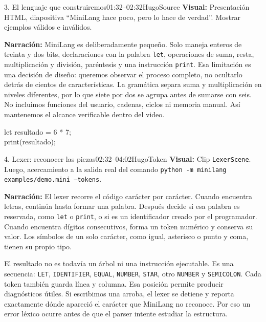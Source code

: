 \documentclass[11pt,letterpaper]{article}
\newcommand{\visual}[1]{\textbf{Visual:} #1}
\begin{document}
\begin{segmento}{3. El lenguaje que construiremos}{01:32--02:32}{Hugo}{Source}
\visual{Presentación HTML, diapositiva ``MiniLang hace poco, pero lo hace de verdad''. Mostrar ejemplos válidos e inválidos.}

\textbf{Narración:} MiniLang es deliberadamente pequeño. Solo maneja enteros de treinta y dos bits, declaraciones con la palabra \texttt{let}, operaciones de suma, resta, multiplicación y división, paréntesis y una instrucción \texttt{print}. Esa limitación es una decisión de diseño: queremos observar el proceso completo, no ocultarlo detrás de cientos de características. La gramática separa suma y multiplicación en niveles diferentes, por lo que siete por dos se agrupa antes de sumarse con seis. No incluimos funciones del usuario, cadenas, ciclos ni memoria manual. Así mantenemos el alcance verificable dentro del video.

\begin{tcolorbox}[colback=Paper!45,colframe=Source,arc=0pt,boxrule=0.6pt]
\ttfamily let resultado = 6 * 7;\\
print(resultado);
\end{tcolorbox}
\end{segmento}

\begin{segmento}{4. Lexer: reconocer las piezas}{02:32--04:02}{Hugo}{Token}
\visual{Clip \texttt{LexerScene}. Luego, acercamiento a la salida real del comando \texttt{python -m minilang examples/demo.mini --tokens}.}

\textbf{Narración:} El lexer recorre el código carácter por carácter. Cuando encuentra letras, continúa hasta formar una palabra. Después decide si esa palabra es reservada, como \texttt{let} o \texttt{print}, o si es un identificador creado por el programador. Cuando encuentra dígitos consecutivos, forma un token numérico y conserva su valor. Los símbolos de un solo carácter, como igual, asterisco o punto y coma, tienen su propio tipo.

El resultado no es todavía un árbol ni una instrucción ejecutable. Es una secuencia: \texttt{LET}, \texttt{IDENTIFIER}, \texttt{EQUAL}, \texttt{NUMBER}, \texttt{STAR}, otro \texttt{NUMBER} y \texttt{SEMICOLON}. Cada token también guarda línea y columna. Esa posición permite producir diagnósticos útiles. Si escribimos una arroba, el lexer se detiene y reporta exactamente dónde apareció el carácter que MiniLang no reconoce. Por eso un error léxico ocurre antes de que el parser intente estudiar la estructura.
\end{segmento}
\end{document}
